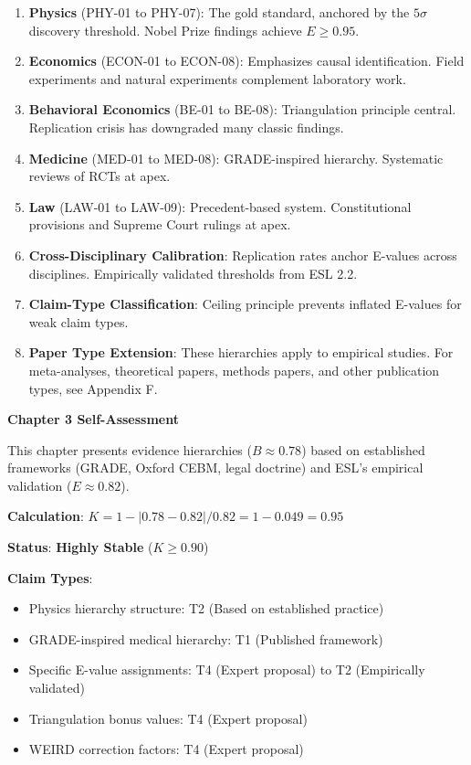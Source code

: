 \documentclass[11pt,a4paper]{article}
\theoremstyle{remark}
\begin{document}
\begin{enumerate}
    \item \textbf{Physics} (PHY-01 to PHY-07): The gold standard, anchored by the $5\sigma$ discovery threshold. Nobel Prize findings achieve $E \geq 0.95$.

    \item \textbf{Economics} (ECON-01 to ECON-08): Emphasizes causal identification. Field experiments and natural experiments complement laboratory work.

    \item \textbf{Behavioral Economics} (BE-01 to BE-08): Triangulation principle central. Replication crisis has downgraded many classic findings.

    \item \textbf{Medicine} (MED-01 to MED-08): GRADE-inspired hierarchy. Systematic reviews of RCTs at apex.

    \item \textbf{Law} (LAW-01 to LAW-09): Precedent-based system. Constitutional provisions and Supreme Court rulings at apex.

    \item \textbf{Cross-Disciplinary Calibration}: Replication rates anchor E-values across disciplines. Empirically validated thresholds from ESL 2.2.

    \item \textbf{Claim-Type Classification}: Ceiling principle prevents inflated E-values for weak claim types.

    \item \textbf{Paper Type Extension}: These hierarchies apply to empirical studies. For meta-analyses, theoretical papers, methods papers, and other publication types, see Appendix F.
\end{enumerate}

\begin{eslbox}
\textbf{Chapter 3 Self-Assessment}

This chapter presents evidence hierarchies ($B \approx 0.78$) based on established frameworks (GRADE, Oxford CEBM, legal doctrine) and ESL's empirical validation ($E \approx 0.82$).

\textbf{Calculation}: $K = 1 - |0.78 - 0.82| / 0.82 = 1 - 0.049 = 0.95$

\textbf{Status}: \textcolor{eslgreen}{\textbf{Highly Stable}} ($K \geq 0.90$)

\textbf{Claim Types}:
\begin{itemize}
    \item Physics hierarchy structure: T2 (Based on established practice)
    \item GRADE-inspired medical hierarchy: T1 (Published framework)
    \item Specific E-value assignments: T4 (Expert proposal) to T2 (Empirically validated)
    \item Triangulation bonus values: T4 (Expert proposal)
    \item WEIRD correction factors: T4 (Expert proposal)
\end{itemize}
\end{eslbox}
\end{document}
